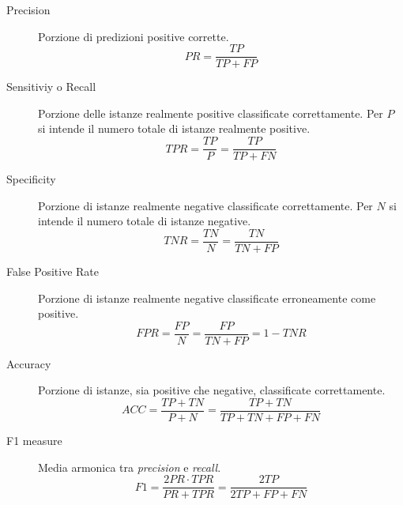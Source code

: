             \begin{description}
                \item [Precision] Porzione di predizioni positive corrette.
                \begin{equation}
                    \label{eq:precision}
                    PR = \frac{TP}{TP + FP}
                \end{equation}

                \item [Sensitiviy o Recall] Porzione delle istanze realmente positive classificate correttamente. Per $P$ si intende il numero totale di istanze realmente positive.
                \begin{equation}
                    \label{eq:tpr}
                    TPR = \frac{TP}{P} = \frac{TP}{TP + FN}
                \end{equation}

                \item [Specificity] Porzione di istanze realmente negative classificate correttamente. Per $N$ si intende il numero totale di istanze negative.
                \begin{equation}
                    \label{eq:tnr} 
                    TNR = \frac{TN}{N} = \frac{TN}{TN + FP}
                \end{equation}

                \item [False Positive Rate] Porzione di istanze realmente negative classificate erroneamente come positive.
                \begin{equation}
                    \label{eq:fpr}
                    FPR = \frac{FP}{N} = \frac{FP}{TN + FP} = 1 - TNR
                \end{equation}

                \item [Accuracy] Porzione di istanze, sia positive che negative, classificate correttamente.
                \begin{equation}
                    \label{eq:accuracy}
                    ACC = \frac{TP+TN}{P + N} = \frac{TP + TN}{TP + TN + FP + FN}
                \end{equation}

                \item [F1 measure] Media armonica tra \emph{precision} e \emph{recall}.
                \begin{equation}
                    \label{eq:f1_measure}
                    F1 = \frac{2PR\cdot TPR}{PR + TPR} = \frac{2TP}{2TP + FP + FN}
                \end{equation}
            \end{description}

